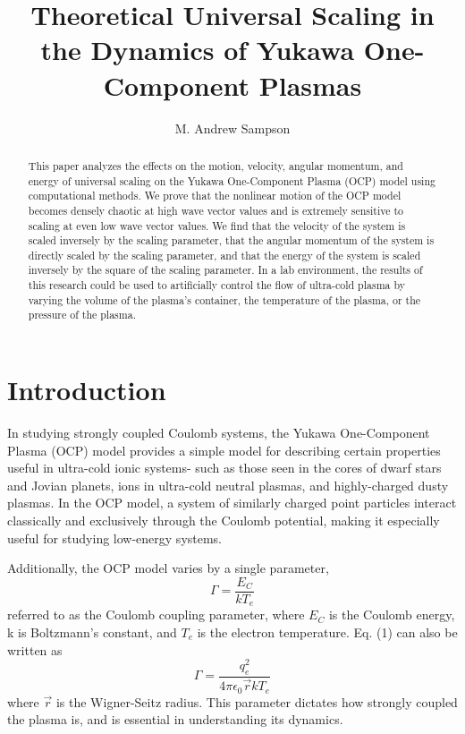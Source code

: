\documentclass{article}
\title{Theoretical Universal Scaling in the Dynamics of Yukawa One-Component Plasmas}
\author{M. Andrew Sampson}
\begin{document}
\maketitle 
\renewcommand\abstractname{}
\begin{abstract}
This paper analyzes the effects on the motion, velocity, angular momentum, and energy of universal scaling on the Yukawa One-Component Plasma (OCP) model using computational methods. We prove that the nonlinear motion of the OCP model becomes densely chaotic at high wave vector values and is extremely sensitive to scaling at even low wave vector values. We find that the velocity of the system is scaled inversely by the scaling parameter, that the angular momentum of the system is directly scaled by the scaling parameter, and that the energy of the system is scaled inversely by the square of the scaling parameter. In a lab environment, the results of this research could be used to artificially control the flow of ultra-cold plasma by varying the volume of the plasma's container, the temperature of the plasma, or the pressure of the plasma.
\end{abstract}

\section{Introduction}
					
In studying strongly coupled Coulomb systems, the Yukawa One-Component Plasma (OCP) model provides a simple model for describing certain properties useful in ultra-cold ionic systems- such as those seen in the cores of dwarf stars and Jovian planets, ions in ultra-cold
neutral plasmas, and highly-charged dusty plasmas\cite{ocp1}. In the OCP model, a system of similarly charged point particles interact classically and exclusively through the Coulomb potential, making it especially useful for studying low-energy systems.

Additionally, the OCP model varies by a single parameter,
\begin{equation}
\Gamma = \frac{E_{C}}{kT_{e}}
\end{equation}
referred to as the Coulomb coupling parameter, where $E_{C}$ is the Coulomb energy, k is Boltzmann's constant, and $T_{e}$ is the electron temperature. Eq. (1) can also be written as
\begin{equation}
\Gamma = \frac{q_{e}^2}{4\pi \epsilon_{0} \vec{r}kT_{e}}
\end{equation}
where $\vec{r}$ is the  Wigner-Seitz radius\cite{ocp2}. This parameter dictates how strongly coupled the plasma is, and is essential in understanding its dynamics.
\end{document}
